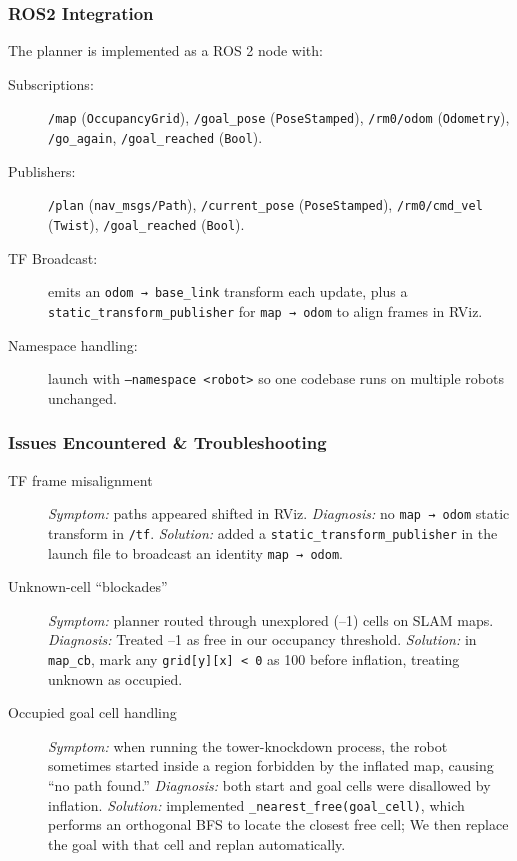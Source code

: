 \subsubsection{ROS2 Integration}
The planner is implemented as a ROS 2 node with:
\begin{description}
  \item[Subscriptions:] 
    \texttt{/map} (\texttt{OccupancyGrid}), 
    \texttt{/goal\_pose} (\texttt{PoseStamped}), 
    \texttt{/rm0/odom} (\texttt{Odometry}), 
    \texttt{/go\_again}, \texttt{/goal\_reached} (\texttt{Bool}).
  \item[Publishers:] 
    \texttt{/plan} (\texttt{nav\_msgs/Path}), 
    \texttt{/current\_pose} (\texttt{PoseStamped}), 
    \texttt{/rm0/cmd\_vel} (\texttt{Twist}), 
    \texttt{/goal\_reached} (\texttt{Bool}).
  \item[TF Broadcast:] emits an \texttt{odom → base\_link} transform each update, plus a \texttt{static\_transform\_publisher} for \texttt{map → odom} to align frames in RViz.
  \item[Namespace handling:] launch with \texttt{--namespace <robot>} so one codebase runs on multiple robots unchanged.
\end{description}

\subsubsection{Issues Encountered \& Troubleshooting}
\begin{description}
  \item[TF frame misalignment] 
    \textit{Symptom:} paths appeared shifted in RViz.  
    \textit{Diagnosis:} no \texttt{map → odom} static transform in \texttt{/tf}.  
    \textit{Solution:} added a \texttt{static\_transform\_publisher} in the launch file to broadcast an identity \texttt{map → odom}.
  \item[Unknown-cell “blockades”] 
    \textit{Symptom:} planner routed through unexplored (–1) cells on SLAM maps.  
    \textit{Diagnosis:} Treated –1 as free in our occupancy threshold.  
    \textit{Solution:} in \texttt{map\_cb}, mark any \texttt{grid[y][x] < 0} as 100 before inflation, treating unknown as occupied.
  \item[Occupied goal cell handling] 
    \textit{Symptom:} when running the tower-knockdown process, the robot sometimes started inside a region forbidden by the inflated map, causing “no path found.”  
    \textit{Diagnosis:} both start and goal cells were disallowed by inflation.  
    \textit{Solution:} implemented \texttt{\_nearest\_free(goal\_cell)}, which performs an orthogonal BFS to locate the closest free cell; We then replace the goal with that cell and replan automatically.
\end{description}
